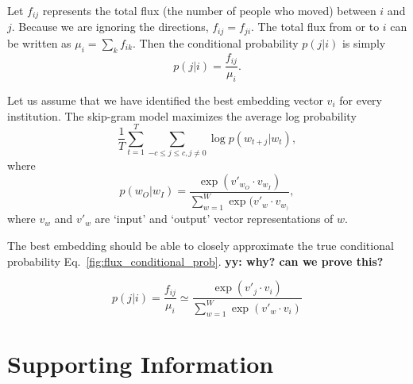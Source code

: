 \documentclass[12pt]{article} %
\def\figdir{../Figs}
\newcommand{\beginsupplement}{%
        \setcounter{table}{0}
        \renewcommand{\thetable}{S\arabic{table}}%
        \setcounter{figure}{0}
        \renewcommand{\thefigure}{S\arabic{figure}}%
     }
\def\yy#1{ {\color{red}\textbf{yy: #1}} }
\begin{document}
Let $f_{ij}$ represents the total flux (the number of people who moved) between $i$ and $j$. 
Because we are ignoring the directions, $f_{ij} = f_{ji}$. 
The total flux from or to $i$ can be written as $\mu_{i} = \sum_k f_{ik}$. 
Then the conditional probability $p(j|i)$ is simply
\begin{equation}\label{fig:flux_conditional_prob}
p(j|i) = \frac{f_{ij}}{\mu_i}. 
\end{equation}

Let us assume that we have identified the best embedding vector $v_i$ for every institution. 
The skip-gram model maximizes the average log probability
\begin{equation}
\frac{1}{T}\sum_{t=1}^{T} \sum_{-c \le j \le c, j \neq 0} \log p(w_{t+j}|w_t),  
\end{equation}
where 
\begin{equation}
p(w_O|w_I) = \frac{\exp(v'_{w_{O} }\cdot v_{w_{I}})}{\sum_{w=1}^{W} \exp(v'_w \cdot v_{w_{)}}}, 
\end{equation}
where $v_w$ and $v'_w$ are `input' and `output' vector representations of $w$. 

The best embedding should be able to closely approximate the true conditional probability Eq.~\ref{fig:flux_conditional_prob}.  \yy{why? can we prove this?} 

\begin{equation}
p(j|i) = \frac{f_{ij}}{\mu_i} \simeq \frac{\exp(v'_j \cdot v_i)}{\sum_{w=1}^{W} \exp(v'_w \cdot v_i)}
\end{equation}




\newpage
\beginsupplement
\section{Supporting Information}
\end{document}
